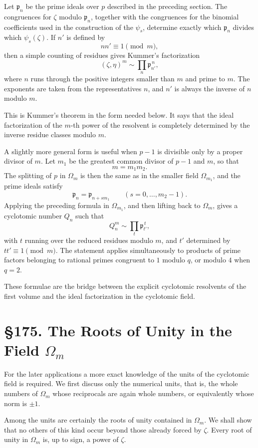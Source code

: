 \documentclass[12pt,a4paper]{article}
\newcommand{\webersection}[2]{\clearpage\section*{\S #1. #2}}
\newcommand{\p}{\mathfrak p}
\begin{document}
Let \(\p_n\) be the prime ideals over \(p\) described in the preceding section.  The congruences for \(\zeta\) modulo \(\p_n\), together with the congruences for the binomial coefficients used in the construction of the \(\psi_s\), determine exactly which \(\p_n\) divides which \(\psi_s(\zeta)\).  If \(n'\) is defined by
\[
  nn'\equiv1\pmod m,
\tag{7}
\]
then a simple counting of residues gives Kummer's factorization
\[
  (\zeta,\eta)^m\sim\prod_n \p_{n'}^{\,n},
\tag{8}
\]
where \(n\) runs through the positive integers smaller than \(m\) and prime to \(m\).  The exponents are taken from the representatives \(n\), and \(n'\) is always the inverse of \(n\) modulo \(m\).

This is Kummer's theorem in the form needed below.  It says that the ideal factorization of the \(m\)-th power of the resolvent is completely determined by the inverse residue classes modulo \(m\).

A slightly more general form is useful when \(p-1\) is divisible only by a proper divisor of \(m\).  Let \(m_1\) be the greatest common divisor of \(p-1\) and \(m\), so that
\[
  m=m_1m_2.
\]
The splitting of \(p\) in \(\Omega_m\) is then the same as in the smaller field \(\Omega_{m_1}\), and the prime ideals satisfy
\[
  \p_{n}=\p_{n+sm_1}\qquad (s=0,\ldots,m_2-1).
\]
Applying the preceding formula in \(\Omega_{m_1}\), and then lifting back to \(\Omega_m\), gives a cyclotomic number \(Q_n\) such that
\[
  Q_n^m\sim \prod_t \p_{t'}^{\,t},
\tag{9}
\]
with \(t\) running over the reduced residues modulo \(m\), and \(t'\) determined by \(tt'\equiv1\pmod m\).  The statement applies simultaneously to products of prime factors belonging to rational primes congruent to \(1\) modulo \(q\), or modulo \(4\) when \(q=2\).

These formulae are the bridge between the explicit cyclotomic resolvents of the first volume and the ideal factorization in the cyclotomic field.


\webersection{175}{The Roots of Unity in the Field \(\Omega_m\)}

For the later applications a more exact knowledge of the units of the cyclotomic field is required.  We first discuss only the numerical units, that is, the whole numbers of \(\Omega_m\) whose reciprocals are again whole numbers, or equivalently whose norm is \(\pm1\).

Among the units are certainly the roots of unity contained in \(\Omega_m\).  We shall show that no others of this kind occur beyond those already forced by \(\zeta\).  Every root of unity in \(\Omega_m\) is, up to sign, a power of \(\zeta\).
\end{document}
